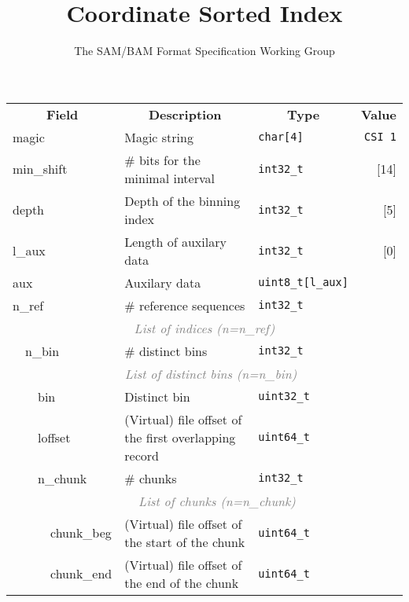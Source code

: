 \documentclass[10pt]{article}
\begin{document}
\title{Coordinate Sorted Index}
\author{The SAM/BAM Format Specification Working Group}
\maketitle

\begin{table}[ht]
{\small
\begin{tabular}{|l|l|l|l|l|l|r|}
  \cline{1-7}
  \multicolumn{4}{|c|}{\bf Field} & \multicolumn{1}{c|}{\bf Description} & \multicolumn{1}{c|}{\bf Type} & \multicolumn{1}{c|}{\bf Value} \\\cline{1-7}
  \multicolumn{4}{|l|}{\sf magic} & Magic string & {\tt char[4]} & {\tt CSI\char92 1}\\\cline{1-7}
  \multicolumn{4}{|l|}{\sf min\_shift} & \# bits for the minimal interval & {\tt int32\_t} & [14]\\\cline{1-7}
  \multicolumn{4}{|l|}{\sf depth} & Depth of the binning index & {\tt int32\_t} & [5]\\\cline{1-7}
  \multicolumn{4}{|l|}{\sf l\_aux} & Length of auxilary data & {\tt int32\_t} & [0]\\\cline{1-7}
  \multicolumn{4}{|l|}{\sf aux} & Auxilary data & {\tt uint8\_t[l\_aux]} & \\\cline{1-7}
  \multicolumn{4}{|l|}{\sf n\_ref} & \# reference sequences & {\tt int32\_t} & \\\cline{1-7}
  \multicolumn{7}{|c|}{\textcolor{gray}{\it List of indices (n=n\_ref)}} \\\cline{2-7}
  & \multicolumn{3}{l|}{\sf n\_bin} & \# distinct bins & {\tt int32\_t} & \\\cline{2-7}
  & \multicolumn{6}{c|}{\textcolor{gray}{\it List of distinct bins (n=n\_bin)}} \\\cline{3-7}
  & & \multicolumn{2}{l|}{\sf bin} & Distinct bin & {\tt uint32\_t} & \\\cline{3-7}
  & & \multicolumn{2}{l|}{\sf loffset} & (Virtual) file offset of the first overlapping record & {\tt uint64\_t} & \\\cline{3-7}
  & & \multicolumn{2}{l|}{\sf n\_chunk} & \# chunks & {\tt int32\_t} & \\\cline{3-7}
  & & \multicolumn{5}{c|}{\textcolor{gray}{\it List of chunks (n=n\_chunk)}} \\\cline{4-7}
  & & & {\sf chunk\_beg} & (Virtual) file offset of the start of the chunk & {\tt uint64\_t} & \\\cline{4-7}
  & & & {\sf chunk\_end} & (Virtual) file offset of the end of the chunk & {\tt uint64\_t} & \\\cline{1-7}

\end{tabular}}
\end{table}
\end{document}

